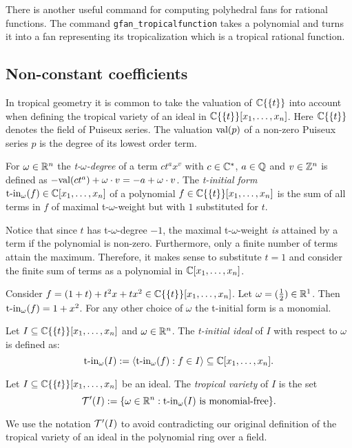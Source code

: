 There is another useful command for computing polyhedral fans for
rational functions. The command \texttt{gfan\_tropicalfunction} takes a
polynomial and turns it into a fan representing its tropicalization
which is a tropical rational function.

\subsection{Non-constant coefficients}
\label{sec:non-constant}
In tropical geometry it is common to take the valuation of
$\mathbb{C}\{\{t\}\}$ into account when defining the tropical variety of
an ideal in $\mathbb{C}\{\{t\}\}[x_1,\dots,x_n]$.  Here $\mathbb{C}\{\{t\}\}$ denotes the field of
Puiseux series. The valuation $\textup{val}(p)$ of a non-zero Puiseux
series $p$ is the degree of its lowest order term.


\begin{definition}
For $\omega\in\mathbb{R}^n$ the \emph{t-$\omega$-degree} of a term $ct^ax^v$
with $c\in\mathbb{C}^*$, $a\in \mathbb{Q}$ and $v\in\mathbb{Z}^n$ is defined as
$-\textup{val}(ct^a)+\omega\cdot v=-a+\omega\cdot v$.  The \emph{t-initial
form} $\textup{t-in}_\omega(f)\in\mathbb{C}[x_1,\dots,x_n]$ of a polynomial
$f\in{\ensuremath{\mathbb{C}\{\{t\}\}} }[x_1,\dots,x_n]$ is the sum of all terms in $f$ of maximal
t-$\omega$-weight but with $1$ substituted for $t$.
\end{definition}
\begin{remark}
Notice that since $t$ has t-$\omega$-degree $-1$, the maximal
t-$\omega$-weight \emph{is} attained by a term if the polynomial is
non-zero. Furthermore, only a finite number of terms attain the
maximum. Therefore, it makes sense to substitute $t=1$ and consider
the finite sum of terms as a polynomial in $\mathbb{C}[x_1,\dots,x_n]$.
\end{remark}
\begin{example}
Consider $f=(1+t)+t^2x+tx^2\in{\ensuremath{\mathbb{C}\{\{t\}\}} }[x_1,\dots,x_n]$. Let $\omega=({1\over
2})\in\mathbb{R}^1$. Then $\textup{t-in}_\omega(f)=1+x^2$. For any
other choice of $\omega$ the t-initial form is a monomial.
\end{example}
\begin{definition}
Let $I\subseteq {\ensuremath{\mathbb{C}\{\{t\}\}} }[x_1,\dots,x_n]$ and $\omega\in\mathbb{R}^n$. The \emph{t-initial ideal} of $I$ with respect to $\omega$ is defined as:
$$\textup{t-in}_\omega(I):=\langle \textup{t-in}_\omega(f):f\in I\rangle\subseteq\mathbb{C}[x_1,\dots,x_n].$$
\end{definition}

\begin{definition}
\label{def:tropvar}
Let $I\subseteq {\ensuremath{\mathbb{C}\{\{t\}\}} }[x_1,\dots,x_n]$ be an ideal. The \emph{tropical variety} of $I$ is the set
$$ \mathcal{T} '(I):=\{\omega\in\mathbb{R}^n:\textup{t-in}_\omega(I) \textup{ is monomial-free}\}.$$
\end{definition}
We use the notation $ \mathcal{T} '(I)$ to avoid contradicting our original definition
of the tropical variety of an ideal in the polynomial ring over a
field.


